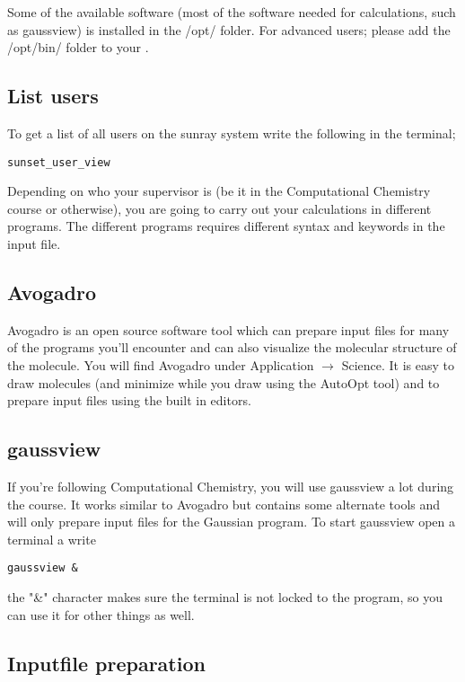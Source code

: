 \documentclass{article}
\begin{document}
Some of the available software (most of the software needed for calculations, such as gaussview) is installed in the /opt/ folder.
For advanced users; please add the /opt/bin/ folder to your .\\

\subsection*{List users}

To get a list of all users on the sunray system write the following in the terminal;

\begin{lstlisting}
sunset_user_view
\end{lstlisting}


Depending on who your supervisor is (be it in the Computational Chemistry course or otherwise), you are going to carry out your calculations in different programs.
The different programs requires different syntax and keywords in the input file.\\

\subsection*{Avogadro}

Avogadro is an open source software tool which can prepare input files for many of the programs you'll encounter and can also visualize the molecular structure of the molecule.
You will find Avogadro under Application $\rightarrow$ Science.
It is easy to draw molecules (and minimize while you draw using the AutoOpt tool) and to prepare input files using the built in editors.

\subsection*{gaussview}

If you're following Computational Chemistry, you will use gaussview a lot during the course.
It works similar to Avogadro but contains some alternate tools and will only prepare input files for the Gaussian program.
To start gaussview open a terminal a write
\begin{lstlisting}
gaussview &
\end{lstlisting}

the "\&" character makes sure the terminal is not locked to the program, so you can use it for other things as well.


\subsection*{Inputfile preparation}
\end{document}
